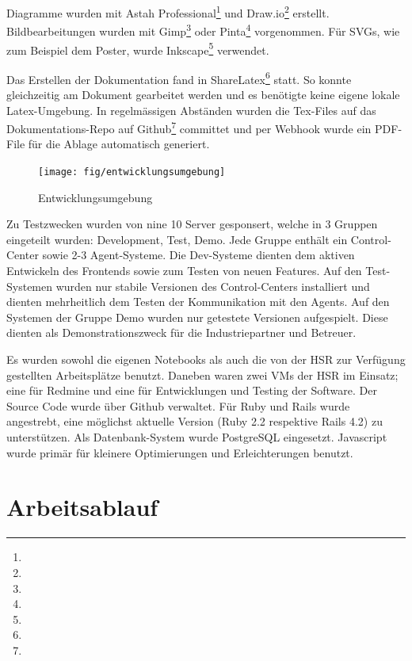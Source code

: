 Diagramme wurden mit Astah Professional\footnote{} und Draw.io\footnote{} erstellt. Bildbearbeitungen wurden mit Gimp\footnote{} oder Pinta\footnote{} vorgenommen. Für SVGs, wie zum Beispiel dem Poster, wurde Inkscape\footnote{} verwendet.

Das Erstellen der Dokumentation fand in ShareLatex\footnote{} statt. So konnte gleichzeitig am Dokument gearbeitet werden und es benötigte keine eigene lokale Latex-Umgebung. In regelmässigen Abständen wurden die Tex-Files auf das Dokumentations-Repo auf Github\footnote{} committet und per Webhook wurde ein PDF-File für die Ablage automatisch generiert.

\begin{figure}[H]
	\centering
	\texttt{[image: fig/entwicklungsumgebung]}
	\caption{Entwicklungsumgebung}
	\label{fig:pm:entwicklungsumgebung}
\end{figure}

Zu Testzwecken wurden von \gls{nine} 10 Server gesponsert, welche  in 3 Gruppen eingeteilt wurden: Development, Test, Demo. Jede Gruppe enthält ein Control-Center sowie 2-3 Agent-Systeme. Die Dev-Systeme dienten dem aktiven Entwickeln des Frontends sowie zum Testen von neuen Features. Auf den Test-Systemen wurden nur stabile Versionen des Control-Centers installiert und dienten mehrheitlich dem Testen der Kommunikation mit den Agents. Auf den Systemen der Gruppe Demo wurden nur getestete Versionen aufgespielt. Diese dienten als Demonstrationszweck für die Industriepartner und Betreuer.

Es wurden sowohl die eigenen Notebooks als auch die von der HSR zur Verfügung gestellten Arbeitsplätze benutzt. Daneben waren zwei VMs der HSR im Einsatz; eine für Redmine und eine für Entwicklungen und Testing der Software. Der Source Code wurde über Github verwaltet.
Für Ruby und Rails wurde angestrebt, eine möglichst aktuelle Version (Ruby 2.2 respektive Rails 4.2) zu unterstützen. Als Datenbank-System wurde PostgreSQL eingesetzt. Javascript wurde primär für kleinere Optimierungen und Erleichterungen benutzt.

\clearpage
\section{Arbeitsablauf}


